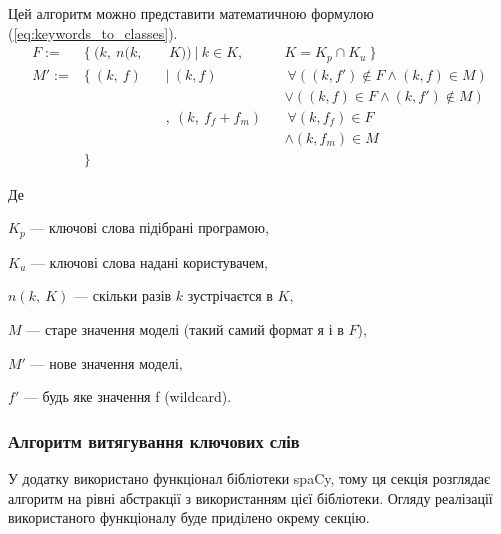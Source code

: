 \documentclass[14pt]{extarticle}
\begin{document}
  Цей алгоритм можно представити математичною формулою
    (\ref{eq:keywords_to_classes}).
  \begin{equation}
    \begin{alignedat}{3}
      F := &\{~ (k,~ n(k,&&~ K)) ~|~ k \in K,~ &&K = K_p \cap K_u ~\} \\
      M':= &\{~ (k,~ f)  &&|~ (k, f)          &&~\forall ((k, f') \notin F
           \land   (k, f) \in M) \\
           &             &&                    &&\lor   ((k, f) \in F
           \land   (k, f') \notin M) \\
           &             &&,~ (k,~ f_f + f_m) &&~\forall (k, f_f) \in F \\
           &             &&                    &&\land   (k, f_m) \in M \\
           &\}
    \end{alignedat}
    \label{eq:keywords_to_classes}
  \end{equation}

  Де

  $K_p$ --- ключові слова підібрані програмою,

  $K_u$ --- ключові слова надані користувачем,

  $n(k,~ K)$ --- скільки разів $k$ зустрічаєтся в $K$,

  $M$ --- старе значення моделі (такий самий формат я і в $F$),

  $M'$ --- нове значення моделі,

  $f'$ --- будь яке значення f (wildcard).

  \subsubsection{Алгоритм витягування ключових слів}
  У додатку використано функціонал бібліотеки spaCy,
  тому ця секція розглядає алгоритм \cite{wiki_algorithm} на рівні абстракції
  \cite{wiki_abstraction,wiki_abstraction_layer}
  з використанням цієї бібліотеки.
  Огляду реалізації використаного функціоналу буде приділено окрему секцію.
\end{document}
